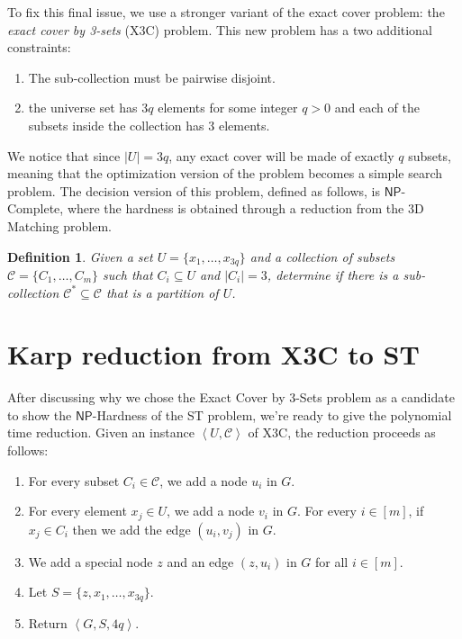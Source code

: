 \documentclass[12pt,a4paper]{article}
\newtheorem{definition}{Definition}
\newcommand{\abs}[1]{\left|#1\right|}
\newcommand{\abk}[1]{\left\langle#1\right\rangle}
\begin{document}
    To fix this final issue, we use a stronger variant of the exact cover problem: the \textit{exact cover by 3-sets} (X3C) problem. This new problem has a two additional constraints:
    \begin{enumerate}
        \item The sub-collection must be pairwise disjoint.
        \item the universe set has $3q$ elements for some integer $q > 0$ and each of the subsets inside the collection has $3$ elements.
    \end{enumerate}
    
    We notice that since $\abs{U} = 3q$, any exact cover will be made of exactly $q$ subsets, meaning that the optimization version of the problem becomes a simple search problem. The decision version of this problem, defined as follows, is $\mathsf{NP}$-Complete, where the hardness is obtained through a reduction from the 3D Matching problem.

    \begin{definition}
        Given a set $U = \{x_1, \ldots, x_{3q}\}$ and a collection of subsets $\mathcal{C} = \{C_1, \ldots, C_m\}$ such that $C_i \subseteq U$ and $\abs{C_i} = 3$, determine if there is a sub-collection $\mathcal{C}^* \subseteq  \mathcal{C}$ that is a partition of $U$.
    \end{definition}

    \section{Karp reduction from X3C to ST}

    After discussing why we chose the Exact Cover by 3-Sets problem as a candidate to show the $\mathsf{NP}$-Hardness of the ST problem, we're ready to give the polynomial time reduction. Given an instance $\abk{U,\mathcal{C}}$ of X3C, the reduction proceeds as follows:
    \begin{enumerate}
        \item For every subset $C_i \in \mathcal{C}$, we add a node $u_i$ in $G$.
        \item For every element $x_j \in U$, we add a node $v_i$ in $G$. For every $i \in [m]$, if $x_j \in C_i$ then we add the edge $(u_i, v_j)$ in $G$.
        \item We add a special node $z$ and an edge $(z, u_i)$ in $G$ for all $i \in [m]$.
        \item Let $S = \{z, x_1, \ldots, x_{3q}\}$.
        \item Return $\abk{G,S,4q}$.
    \end{enumerate}
\end{document}
